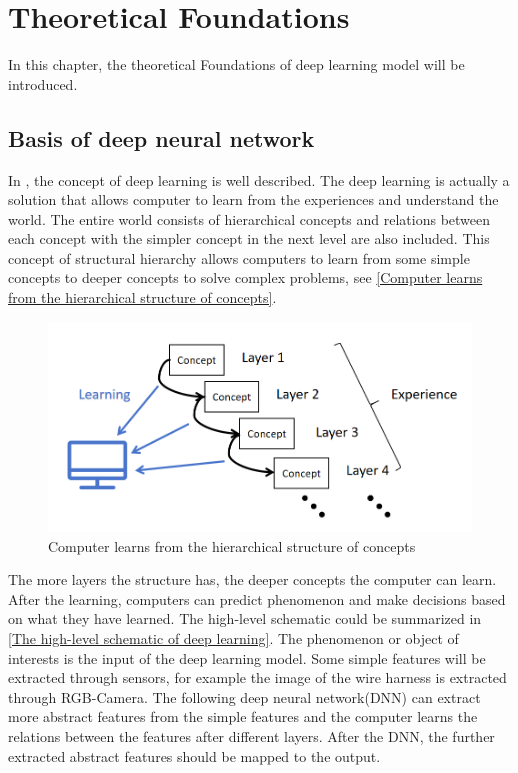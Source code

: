 \chapter{Theoretical Foundations}
In this chapter, the theoretical Foundations of deep learning model will be introduced. 
\section{Basis of deep neural network}
    In \cite{Goodfellow-et-al-2016}, the concept of deep learning is well described. The deep learning is actually a solution that allows 
    computer to learn from the experiences and understand the world. The entire world consists of hierarchical concepts and relations between 
    each concept with the simpler concept in the next level are also included. This concept of structural hierarchy allows computers to learn 
    from some simple concepts to deeper concepts to solve complex problems, see \autoref{Computer learns from the hierarchical structure of concepts}.
    \begin{figure}
		\centering
		\includegraphics[width=0.6\linewidth]{example_images/ConceptDL}
		\caption{Computer learns from the hierarchical structure of concepts}
		\label{Computer learns from the hierarchical structure of concepts}
	  \end{figure}
    The more layers the structure has, the deeper concepts the computer can learn. After the learning, computers can predict phenomenon and make decisions 
    based on what they have learned. The high-level schematic could be summarized in \autoref{The high-level schematic of deep learning}. The phenomenon or object 
    of interests is the input of the deep learning model. Some simple features will be extracted through sensors, for example the image of the wire harness is extracted 
    through RGB-Camera. The following deep neural network(DNN) can extract more abstract features from the simple features and the computer learns the relations between 
    the features after different layers. After the DNN, the further extracted abstract features should be mapped to the output.  

